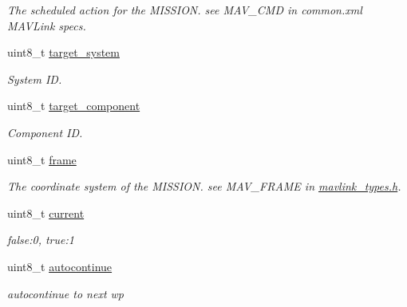 \begin{DoxyCompactItemize}
\begin{DoxyCompactList}\small\item\em The scheduled action for the M\+I\+S\+S\+I\+O\+N. see M\+A\+V\+\_\+\+C\+M\+D in common.\+xml M\+A\+V\+Link specs. \end{DoxyCompactList}\item 
\hypertarget{struct____mavlink__mission__item__t_ab6e5076aa5f0e524e88879bebf0ed483}{uint8\+\_\+t \hyperlink{struct____mavlink__mission__item__t_ab6e5076aa5f0e524e88879bebf0ed483}{target\+\_\+system}}\label{struct____mavlink__mission__item__t_ab6e5076aa5f0e524e88879bebf0ed483}

\begin{DoxyCompactList}\small\item\em System I\+D. \end{DoxyCompactList}\item 
\hypertarget{struct____mavlink__mission__item__t_a6bb8183ef3416741edca46337e6e6860}{uint8\+\_\+t \hyperlink{struct____mavlink__mission__item__t_a6bb8183ef3416741edca46337e6e6860}{target\+\_\+component}}\label{struct____mavlink__mission__item__t_a6bb8183ef3416741edca46337e6e6860}

\begin{DoxyCompactList}\small\item\em Component I\+D. \end{DoxyCompactList}\item 
\hypertarget{struct____mavlink__mission__item__t_aa3b25a65ef4d62f208ea6d3856b418cb}{uint8\+\_\+t \hyperlink{struct____mavlink__mission__item__t_aa3b25a65ef4d62f208ea6d3856b418cb}{frame}}\label{struct____mavlink__mission__item__t_aa3b25a65ef4d62f208ea6d3856b418cb}

\begin{DoxyCompactList}\small\item\em The coordinate system of the M\+I\+S\+S\+I\+O\+N. see M\+A\+V\+\_\+\+F\+R\+A\+M\+E in \hyperlink{mavlink__types_8h_source}{mavlink\+\_\+types.\+h}. \end{DoxyCompactList}\item 
\hypertarget{struct____mavlink__mission__item__t_aa9fdaa647214fcb6bb21e05f2718f56f}{uint8\+\_\+t \hyperlink{struct____mavlink__mission__item__t_aa9fdaa647214fcb6bb21e05f2718f56f}{current}}\label{struct____mavlink__mission__item__t_aa9fdaa647214fcb6bb21e05f2718f56f}

\begin{DoxyCompactList}\small\item\em false\+:0, true\+:1 \end{DoxyCompactList}\item 
\hypertarget{struct____mavlink__mission__item__t_a2f276d223a22308aed2978c1718bf74f}{uint8\+\_\+t \hyperlink{struct____mavlink__mission__item__t_a2f276d223a22308aed2978c1718bf74f}{autocontinue}}\label{struct____mavlink__mission__item__t_a2f276d223a22308aed2978c1718bf74f}

\begin{DoxyCompactList}\small\item\em autocontinue to next wp \end{DoxyCompactList}\end{DoxyCompactItemize}


